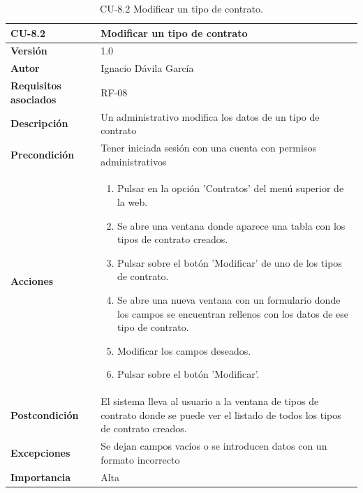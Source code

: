 \begin{table}[p]
	\centering
	\begin{tabularx}{\linewidth}{ p{} p{} }
		\toprule
		\textbf{CU-8.2}    & \textbf{Modificar un tipo de contrato}\\
		\toprule
		\textbf{Versión}              & 1.0    \\
		\textbf{Autor}                & Ignacio Dávila García \\
		\textbf{Requisitos asociados} & RF-08 \\
		\textbf{Descripción}          & Un administrativo modifica los datos de un tipo de contrato \\
		\textbf{Precondición}         & Tener iniciada sesión con una cuenta con permisos administrativos \\
		\textbf{Acciones}             &
		\begin{enumerate}
			\def\labelenumi{\arabic{enumi}.}
			\tightlist
			\item Pulsar en la opción 'Contratos' del menú superior de la web.
			\item Se abre una ventana donde aparece una tabla con los tipos de contrato creados.
			\item Pulsar sobre el botón 'Modificar' de uno de los tipos de contrato.
			\item Se abre una nueva ventana con un formulario donde los campos se encuentran rellenos con los datos de ese tipo de contrato.
			\item Modificar los campos deseados.
			\item Pulsar sobre el botón 'Modificar'.
		\end{enumerate}\\
		\textbf{Postcondición}        & El sistema lleva al usuario a la ventana de tipos de contrato donde se puede ver el listado de todos los tipos de contrato creados. \\
		\textbf{Excepciones}          & Se dejan campos vacíos o se introducen datos con un formato incorrecto \\
		\textbf{Importancia}          & Alta \\
		\bottomrule
	\end{tabularx}
	\caption{CU-8.2 Modificar un tipo de contrato.}
\end{table}

